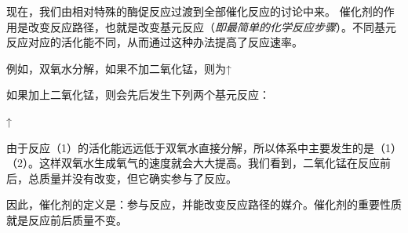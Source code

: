 \begin{multicols}{3}
现在，我们由相对特殊的酶促反应过渡到全部催化反应的讨论中来。
催化剂的作用是改变反应路径，也就是改变基元反应（\textit{即最简单的化学反应步骤}）。不同基元反应对应的活化能不同，从而通过这种办法提高了反应速率。

例如，双氧水分解，如果不加二氧化锰，则为↑

如果加上二氧化锰，则会先后发生下列两个基元反应：
\begin{center}\small
{}↑

\end{center}

由于反应（1）的活化能远远低于双氧水直接分解，所以体系中主要发生的是（1）（2）。这样双氧水生成氧气的速度就会大大提高。我们看到，二氧化锰在反应前后，总质量并没有改变，但它确实参与了反应。

因此，催化剂的定义是：参与反应，并能改变反应路径的媒介。催化剂的重要性质就是反应前后质量不变。\EOA

\end{multicols}
\ADxinhangdao

\newpage


